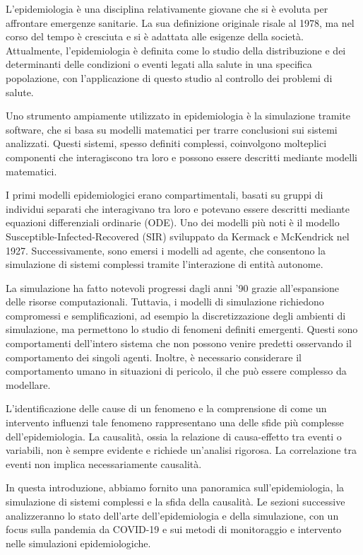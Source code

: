 L'epidemiologia è una disciplina relativamente giovane che si è evoluta 
per affrontare emergenze sanitarie. La sua definizione originale risale 
al 1978, ma nel corso del tempo è cresciuta e si è adattata alle esigenze 
della società. Attualmente, l'epidemiologia è definita come lo studio 
della distribuzione e dei determinanti delle condizioni o eventi legati 
alla salute in una specifica popolazione, con l'applicazione di questo 
studio al controllo dei problemi di salute.

Uno strumento ampiamente utilizzato in epidemiologia è la simulazione 
tramite software, che si basa su modelli matematici per trarre conclusioni 
sui sistemi analizzati. Questi sistemi, spesso definiti complessi, 
coinvolgono molteplici componenti che interagiscono tra loro e possono 
essere descritti mediante modelli matematici.

I primi modelli epidemiologici erano compartimentali, basati su gruppi di 
individui separati che interagivano tra loro e potevano essere descritti 
mediante equazioni differenziali ordinarie (ODE). Uno dei modelli più noti 
è il modello Susceptible-Infected-Recovered (SIR) sviluppato da 
Kermack e McKendrick nel 1927. Successivamente, sono emersi i modelli ad 
agente, che consentono la simulazione di sistemi complessi 
tramite l'interazione di entità autonome.

La simulazione ha fatto notevoli progressi dagli anni '90 grazie 
all'espansione delle risorse computazionali. Tuttavia, i modelli di 
simulazione richiedono compromessi e semplificazioni, ad esempio la 
discretizzazione degli ambienti di simulazione, ma permettono lo 
studio di fenomeni definiti emergenti. Questi sono comportamenti 
dell'intero sistema che non possono venire predetti osservando 
il comportamento dei singoli agenti. Inoltre, è necessario considerare 
il comportamento umano in situazioni di pericolo, il che può 
essere complesso da modellare.

L'identificazione delle cause di un fenomeno e la comprensione di come un 
intervento influenzi tale fenomeno rappresentano una delle sfide più 
complesse dell'epidemiologia. La causalità, ossia la relazione di 
causa-effetto tra eventi o variabili, non è sempre evidente e richiede 
un'analisi rigorosa. La correlazione tra eventi non implica 
necessariamente causalità.

In questa introduzione, abbiamo fornito una panoramica sull'epidemiologia, 
la simulazione di sistemi complessi e la sfida della causalità. 
Le sezioni successive analizzeranno lo stato dell'arte dell'epidemiologia 
e della simulazione, con un focus sulla pandemia da COVID-19 e sui metodi 
di monitoraggio e intervento nelle simulazioni epidemiologiche.